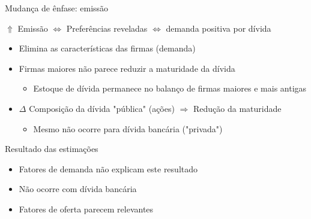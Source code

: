 \documentclass[presentation]{beamer}
\begin{document}
\begin{frame}[label={sec:org79a9cf8}]{Mudança de ênfase: emissão}
\begin{center}
\(\Uparrow\) Emissão \(\Leftrightarrow\) Preferências reveladas \(\Leftrightarrow\) demanda positiva por dívida
\end{center}

\begin{itemize}
\item Elimina as características das firmas (demanda)
\item Firmas maiores não parece reduzir a maturidade da dívida
\begin{itemize}
\item Estoque de dívida permanece no balanço de firmas maiores e mais antigas
\end{itemize}
\item \(\Delta\) Composição da dívida "pública" (ações) \(\Rightarrow\) Redução da maturidade
\begin{itemize}
\item Mesmo não ocorre para dívida bancária ("privada")
\end{itemize}
\end{itemize}

\begin{block}{Resultado das estimações}
\begin{itemize}
\item Fatores de demanda não explicam este resultado
\item Não ocorre com dívida bancária
\item Fatores de oferta parecem relevantes
\end{itemize}
\end{block}
\end{frame}
\end{document}
